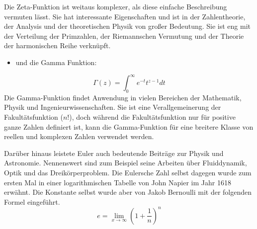 Die Zeta-Funktion ist weitaus komplexer, als diese einfache Beschreibung vermuten lässt. Sie hat interessante Eigenschaften und ist in der Zahlentheorie, der Analysis und der theoretischen Physik von großer Bedeutung. Sie ist eng mit der Verteilung der Primzahlen, der Riemannschen Vermutung und der Theorie der harmonischen Reihe verknüpft.
\begin{itemize}
  \item und die Gamma Funktion:
\end{itemize} \[
\Gamma(z) = \int_0^\infty e^{-t} t^{z-1} dt \] 
Die Gamma-Funktion findet Anwendung in vielen Bereichen der Mathematik, Physik und Ingenieurwissenschaften. Sie ist eine Verallgemeinerung der Fakultätsfunktion ($n!$), doch während die Fakultätsfunktion nur für positive ganze Zahlen definiert ist, kann die Gamma-Funktion für eine breitere Klasse von reellen und komplexen Zahlen verwendet werden.
\par Darüber hinaus leistete Euler auch bedeutende Beiträge zur Physik und Astronomie. Nennenswert sind zum Beispiel seine Arbeiten über Fluiddynamik, Optik und das Dreikörperproblem. Die Eulersche Zahl selbst dagegen wurde zum ersten Mal in einer logarithmischen Tabelle von John Napier im Jahr 1618 erwähnt. Die Konstante selbst wurde aber von Jakob Bernoulli mit der folgenden Formel eingeführt. \[
e = \lim_{x\to\infty}(1+\frac{1}{n})^n \]
